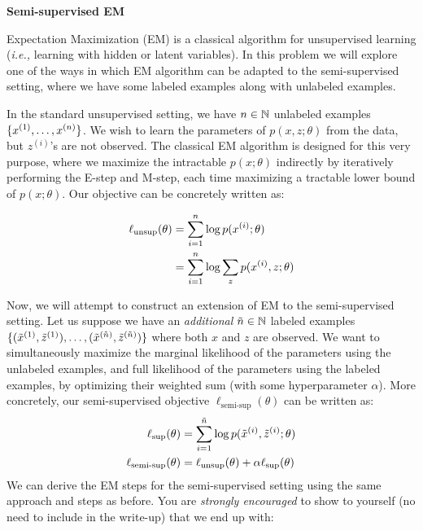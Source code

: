 \item {} {\bf Semi-supervised EM}

\def\zsi{z^{(i)}}
\def\xsi{x^{(i)}}

Expectation Maximization (EM) is a classical algorithm for unsupervised learning (\emph{i.e.,} learning with hidden or latent variables).
In this problem we will explore one of the ways in which EM algorithm can be adapted to the semi-supervised setting, where we have some labeled examples along with unlabeled examples.

In the standard unsupervised setting, we have ${n} \in \mathbb{N}$ unlabeled examples $\{x^{(1)},\ldots,x^{({n})}\}$.
We wish to learn the parameters of $p(x,z;\theta)$ from the data, but $\zsi$'s are not observed.
The classical EM algorithm is designed for this very purpose, where we maximize the intractable $p(x;\theta)$ indirectly by iteratively performing the E-step and M-step, each time maximizing a tractable lower bound of $p(x;\theta)$.
Our objective can be concretely written as:

\begin{align*}
    \ell_{\text{unsup}}(\theta) &= \sum_{i=1}^\nexp \log p(\xsi;\theta) \\
    &= \sum_{i=1}^\nexp \log \sum_{z} p(\xsi,z;\theta)
\end{align*}


Now, we will attempt to construct an extension of EM to the semi-supervised setting. Let us suppose we have an \emph{additional} $\tilde{{n}} \in \mathbb{N}$ labeled examples $\{(\tilde{x}^{(1)},\tilde{z}^{(1)}),\ldots,(\tilde{x}^{(\tilde{{n}})},\tilde{z}^{(\tilde{{n}})})\}$ where both $x$ and $z$ are observed. We want to simultaneously maximize the marginal likelihood of the parameters using the unlabeled examples, and full likelihood of the parameters using the labeled examples, by optimizing their weighted sum (with some hyperparameter $\alpha$). More concretely, our semi-supervised objective $\ell_\text{semi-sup}(\theta)$ can be written as:
%
\begin{align*}
    \ell_\text{sup}(\theta) &= \sum_{i=1}^{\tilde{{n}}} \log p(\tilde{x}^{(i)},\tilde{z}^{(i)};\theta) \\
    \ell_{\text{semi-sup}}(\theta) &= \ell_\text{unsup}(\theta) + \alpha \ell_\text{sup}(\theta)
\end{align*}
%
We can derive the EM steps for the semi-supervised setting using the same approach and steps as before. You are \emph{strongly encouraged} to show to yourself (no need to include in the write-up) that we end up with:

